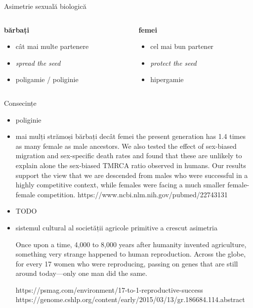 \documentclass{simple}
\begin{document}
\begin{frame}{Asimetrie sexuală biologică}
  \begin{columns}
    \begin{column}{0.5\textwidth}
      \textbf{bărbați}
        \begin{itemize}
          \scriptsize
          \item cât mai multe partenere
          \item \textit{spread the seed}
          \item poligamie / poliginie
        \end{itemize}
    \end{column}
    \begin{column}{0.5\textwidth}
      \textbf{femei}
        \begin{itemize}
          \scriptsize
          \item cel mai bun partener
          \item \textit{protect the seed}
          \item hipergamie
        \end{itemize}
    \end{column}
  \end{columns}
\end{frame}

\begin{frame}{Consecințe}
  \begin{itemize}
    \item poliginie
    \item mai mulți strămoși bărbați decât femei
the present generation has 1.4 times as many female as male ancestors. We also tested the effect of sex-biased migration and sex-specific death rates and found that these are unlikely to explain alone the sex-biased TMRCA ratio observed in humans. Our results support the view that we are descended from males who were successful in a highly competitive context, while females were facing a much smaller female-female competition.
      https://www.ncbi.nlm.nih.gov/pubmed/22743131

    \item TODO
    \item sistemul cultural al societății agricole primitive a crescut asimetria

Once upon a time, 4,000 to 8,000 years after humanity invented agriculture, something very strange happened to human reproduction. Across the globe, for every 17 women who were reproducing, passing on genes that are still around today—only one man did the same.

https://psmag.com/environment/17-to-1-reproductive-success
https://genome.cshlp.org/content/early/2015/03/13/gr.186684.114.abstract

  \end{itemize}
\end{frame}
\end{document}
